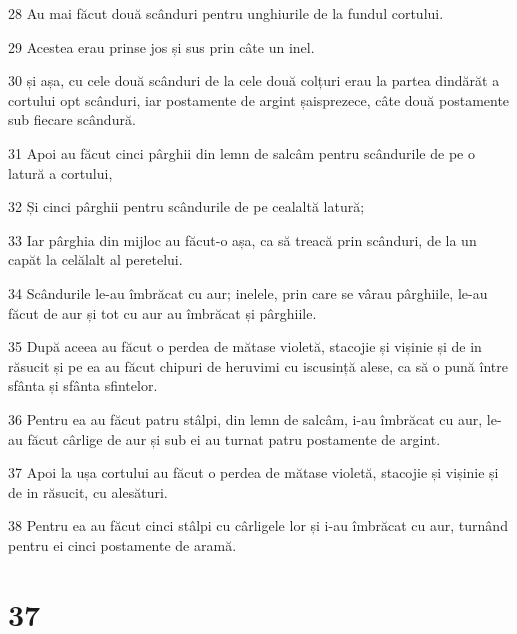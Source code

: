 \par 28 Au mai făcut două scânduri pentru unghiurile de la fundul cortului.
\par 29 Acestea erau prinse jos și sus prin câte un inel.
\par 30 și așa, cu cele două scânduri de la cele două colțuri erau la partea dindărăt a cortului opt scânduri, iar postamente de argint șaisprezece, câte două postamente sub fiecare scândură.
\par 31 Apoi au făcut cinci pârghii din lemn de salcâm pentru scândurile de pe o latură a cortului,
\par 32 Și cinci pârghii pentru scândurile de pe cealaltă latură;
\par 33 Iar pârghia din mijloc au făcut-o așa, ca să treacă prin scânduri, de la un capăt la celălalt al peretelui.
\par 34 Scândurile le-au îmbrăcat cu aur; inelele, prin care se vârau pârghiile, le-au făcut de aur și tot cu aur au îmbrăcat și pârghiile.
\par 35 După aceea au făcut o perdea de mătase violetă, stacojie și vișinie și de in răsucit și pe ea au făcut chipuri de heruvimi cu iscusință alese, ca să o pună între sfânta și sfânta sfintelor.
\par 36 Pentru ea au făcut patru stâlpi, din lemn de salcâm, i-au îmbrăcat cu aur, le-au făcut cârlige de aur și sub ei au turnat patru postamente de argint.
\par 37 Apoi la ușa cortului au făcut o perdea de mătase violetă, stacojie și vișinie și de in răsucit, cu alesături.
\par 38 Pentru ea au făcut cinci stâlpi cu cârligele lor și i-au îmbrăcat cu aur, turnând pentru ei cinci postamente de aramă.

\chapter{37}

